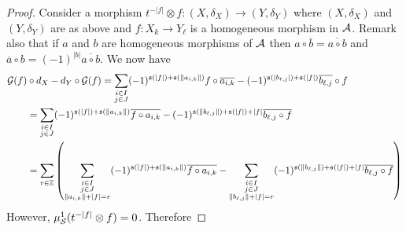 \documentclass[12pt]{article}
\begin{document}
\begin{proof}
		\noindent Consider a morphism $t^{-|f|} \otimes f: (X, \delta_X) \to (Y,\delta_Y)$ where $(X,\delta_X)$ and $(Y,\delta_Y)$ are as above and $f: X_k \to Y_\ell$ is a homogeneous morphism in ${\cal{A}}$. Remark also that if $a$ and $b$ are homogeneous morphisms of ${\cal{A}}$ then $a \circ \overline{b} = \overline{a \circ b}$ and $\overline{a} \circ b = (-1)^{|b|} \overline{a \circ b}$. We now have
		\begin{align*}
			{\cal{G}}(f) &\circ d_X - d_Y \circ {\cal{G}}(f) = \sum_{\substack{i \in I \\ j \in J}} (-1)^{\mathfrak{s}(|f|) + \mathfrak{s}(\|a_{i,k}\|)} f \circ \overline{a_{i,k}} - (-1)^{\mathfrak{s}(|b_{\ell,j}|) + \mathfrak{s}(|f|)} \overline{b_{\ell,j}} \circ f \\
			&= \sum_{\substack{i \in I \\ j \in J}} (-1)^{\mathfrak{s}(|f|) + \mathfrak{s}(\|a_{i,k}\|)} \overline{f \circ a_{i,k}} - (-1)^{\mathfrak{s}(\|b_{\ell,j}\|) + \mathfrak{s}(|f|) + |f|} \overline{b_{\ell,j} \circ f} \\
			&= \sum_{r \in \mathbb{Z}} \left( \sum_{\substack{i \in I \\ j \in J \\ \|a_{i,k}\|+|f| = r}} (-1)^{\mathfrak{s}(|f|) + \mathfrak{s}(\|a_{i,k}\|)} \overline{f \circ a_{i,k}} - \sum_{\substack{i \in I \\ j \in J \\ \|b_{\ell,j}\|+|f| = r}} (-1)^{\mathfrak{s}(\|b_{\ell,j}\|) + \mathfrak{s}(|f|) + |f|} \overline{b_{\ell,j} \circ f} \right)
		\end{align*}
		However, $\mu^1_{{\cal{S}}}(t^{-|f|} \otimes f) = 0$. Therefore
		

\end{proof}
\end{document}
